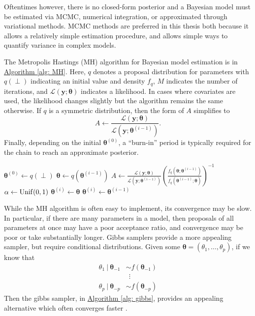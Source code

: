 \documentclass[twoside,12pt,bibstyle=chem-acs]{reedthesis}
\begin{document}
Oftentimes however, there is no closed-form posterior and a Bayesian model must be estimated via MCMC, numerical integration, or approximated through variational methods\cite{gelman_bayesian_2014}. MCMC methods are preferred in this thesis both because it allows a relatively simple estimation procedure, and allows simple ways to quantify variance in complex models.

The Metropolis Hastings (MH) algorithm for Bayesian model estimation is in \hyperref[alg: MH]{Algorithm }\autoref{alg: MH}. Here, $q$ denotes a proposal distribution for parameters with $q(\perp)$ indicating an initial value and density $f_q$, $M$ indicates the number of iterations, and $\mathcal{L}(\bm{y}; \bm\theta)$ indicates a likelihood. In cases where covariates are used, the likelihood changes slightly but the algorithm remains the same otherwise. If $q$ is a symmetric distribution, then the form of $A$ simplifies to
\begin{equation*}
A \gets \frac{\mathcal{L}(\bm{y}; \bm\theta)}{\mathcal{L}(\bm{y}; \bm\theta^{(i-1)})}.
\end{equation*}
Finally, depending on the initial $\bm\theta^{(0)}$, a ``burn-in'' period is typically required for the chain to reach an approximate posterior. 


\begin{algorithm}
\begin{algorithmic}
\State $\bm\theta^{(0)} \gets q(\perp)$
	\State $\bm\theta \gets q(\bm\theta^{(i-1)})$
	\State $A \gets \frac{\mathcal{L}(\bm{y}; \bm\theta)}{\mathcal{L}(\bm{y}; \bm\theta^{(i-1)})}\left(\frac{f_q(\bm\theta; \bm\theta^{(i-1)})}{f_q(\bm\theta^{(i-1)}; \bm\theta)}\right)^{-1}$
	\State $\alpha \gets \mathrm{Unif}(0,1)$
		\State $\bm\theta^{(i)} \gets \bm\theta$
	\Else
		\State $\bm\theta^{(i)} \gets \bm\theta^{(i-1)}$
	\EndIf
\EndFor
\end{algorithmic}
\caption{The MH algorithm for model estimation}
\label{alg: MH}
\end{algorithm}

While the MH algorithm is often easy to implement, its convergence may be slow. In particular, if there are many parameters in a model, then proposals of all parameters at once may have a poor acceptance ratio, and convergence may be poor or take substantially longer. Gibbs samplers provide a more appealing sampler, but require conditional distributions. Given some $\bm\theta = (\theta_1, \dots, \theta_p)$, if we know that
\begin{align*}
\theta_1 ~|~ \bm\theta_{-1} &\sim f(\bm\theta_{-1}) \\
&\ \ \vdots \\
\theta_p ~|~ \bm\theta_{-p} &\sim f(\bm\theta_{-p})
\end{align*}
Then the gibbs sampler, in \hyperref[alg: gibbs]{Algorithm }\autoref{alg: gibbs}, provides an appealing alternative which often converges faster \cite{cite_something}.
\end{document}

